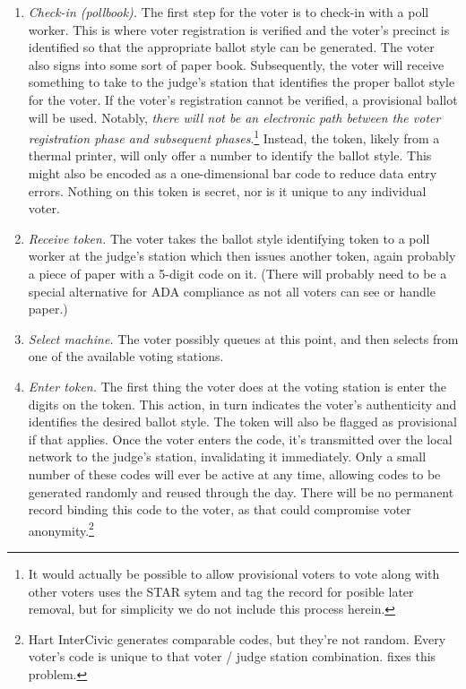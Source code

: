 \begin{enumerate}
\item {\em Check-in (pollbook).}
The first step for the voter is to check-in with a poll worker. This is where voter registration is verified and the voter's precinct is identified so that the appropriate ballot style can be generated. The voter also signs into some sort of paper book. Subsequently, the voter will receive something to take to the judge's station that identifies the proper ballot style for the voter. If the voter's registration cannot be verified, a provisional ballot will be used. Notably, {\em there will not be an electronic path between the voter registration phase and subsequent phases}.\footnote{
It would actually be possible to allow provisional voters to vote along with other voters uses the STAR sytem and tag the record for posible later removal, but for simplicity we do not include this process herein.}
Instead, the token, likely from a thermal printer, will only offer a number to identify the ballot style. This might also be encoded as a one-dimensional bar code to reduce data entry errors. Nothing on this token is secret, nor is it unique to any individual voter.

\item {\em Receive token.}
The voter takes the ballot style identifying token to a poll worker at the judge's station which then issues another token, again probably a piece of paper with a 5-digit code on it. (There will probably need to be a special alternative for ADA compliance as not all voters can see or handle paper.) 

\item {\em Select machine.}
The voter possibly queues at this point, and then selects from one of the available voting stations.

\item  {\em Enter token.}
The first thing the voter does at the voting station is enter the digits on the token. 
This action, in turn indicates the voter's authenticity and identifies the desired ballot style. The token will also be flagged as provisional if that applies. Once the voter enters the code, it's transmitted over the local network to the judge's station, invalidating it immediately. Only a small number of these codes will ever be active at any time, allowing codes to be generated randomly and reused through the day. There will be no permanent record binding this code to the voter, as that could compromise voter anonymity.\footnote{Hart InterCivic generates comparable codes, but they're not random. Every voter's code is unique to that voter / judge station combination. \projname fixes this problem.}


\end{enumerate}
